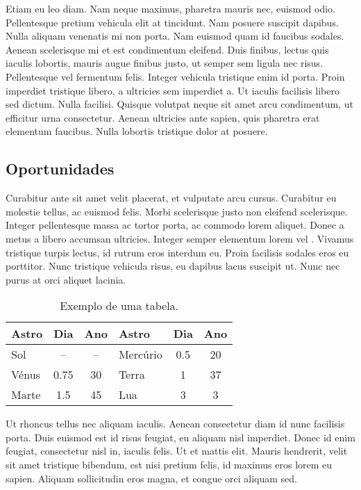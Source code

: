 Etiam eu leo diam. Nam  neque maximus, pharetra mauris nec, euismod odio. Pellentesque pretium vehicula elit at tincidunt. Nam posuere suscipit dapibus. Nulla aliquam venenatis mi non porta. Nam euismod quam id faucibus sodales. Aenean scelerisque mi et est condimentum eleifend. Duis finibus, lectus quis iaculis lobortis, mauris augue finibus justo, ut semper sem ligula nec risus. Pellentesque vel fermentum felis. Integer vehicula tristique enim id porta. Proin imperdiet tristique libero, a ultricies sem imperdiet a. Ut iaculis facilisis libero sed dictum. Nulla facilisi. Quisque volutpat neque sit amet arcu condimentum, ut efficitur urna consectetur. Aenean ultricies ante sapien, quis pharetra erat elementum faucibus. Nulla lobortis tristique dolor at posuere.

\subsection{Oportunidades}

Curabitur  ante sit amet velit placerat, et vulputate arcu cursus. Curabitur eu molestie tellus, ac euismod felis. Morbi scelerisque justo non eleifend scelerisque. Integer pellentesque massa ac tortor porta, ac commodo lorem aliquet. Donec a metus a libero accumsan ultricies. Integer semper elementum lorem vel . Vivamus tristique turpis lectus, id rutrum eros interdum eu. Proin facilisis sodales eros eu porttitor. Nunc tristique vehicula risus, eu dapibus lacus suscipit ut. Nunc nec purus at orci aliquet lacinia.

\begin{table}
	\caption{Exemplo de uma tabela.}
	\begin{center}
		\begin{tabular}{lcc|lcc}
			\textbf{Astro} & \textbf{Dia} & \textbf{Ano} & \textbf{Astro} & \textbf{Dia} & \textbf{Ano}\\
			\hline
			Sol & -- & -- & Mercúrio  & 0.5 & 20 \\
			Vénus & 0.75 & 30 & Terra & 1 & 37 \\
			Marte & 1.5 & 45 & Lua & 3 & 3 
		\end{tabular}
	\end{center}
\end{table}

Ut rhoncus tellus nec aliquam iaculis. Aenean consectetur diam id nunc facilisis porta. Duis euismod est id risus feugiat, eu aliquam nisl imperdiet. Donec id enim feugiat, consectetur nisl in, iaculis felis. Ut et mattis elit. Mauris hendrerit, velit sit amet tristique bibendum, est nisi pretium felis, id maximus eros lorem eu sapien. Aliquam sollicitudin eros magna, et congue orci aliquam sed. 